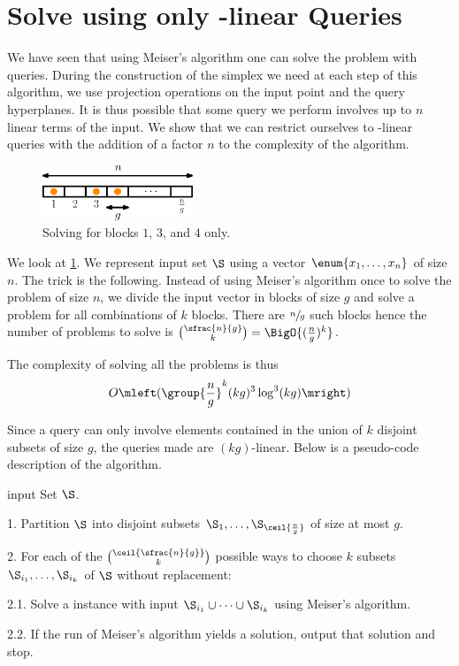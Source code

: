 \section{Solve \kSUM using only -linear Queries}

We have seen that using Meiser's algorithm one can solve the \kSUM problem
with  queries. During the construction of the simplex we
need at each step of this algorithm, we use projection operations on
the input point and the query hyperplanes. It is thus possible that some query we perform
involves up to \(n\) linear terms of the input.
We show that we can restrict ourselves to
-linear queries with the addition of a factor \(n\) to the complexity
of the algorithm.

\begin{figure}
\centering
\includegraphics[width=0.4\textwidth]{fig/point-location/blocks}
\caption{Solving \kSUM for blocks \(1\), \(3\), and \(4\) only.}
\label{fig:point-location:on:blocks}
\end{figure}

We look at \ref{fig:point-location:on:blocks}. We represent input set \(\S\)
using a vector \(\enum{x_1,\ldots,x_n}\) of size \(n\). The trick is the
following. Instead of using Meiser's algorithm once to solve the problem of
size \(n\), we divide the input vector in blocks of size \(g\) and solve a
\kSUM problem for all combinations of \(k\) blocks. There are \(\sfrac{n}{g}\)
such blocks hence the number of problems to solve is \(\binom{\sfrac{n}{g}}{k}
= \BigO{(\frac{n}{g})^k} \).

The complexity of solving all the problems is thus
\begin{displaymath}
O\mleft(\group{\frac{n}{g}}^k (kg)^3 \log^3 (kg)\mright)
\end{displaymath}

Since a query can only involve elements contained in the union of \(k\)
disjoint subsets of size \(g\), the queries made are \((kg)\)-linear. Below is
a pseudo-code description of the algorithm.
\begin{algorithm}
\item[input] Set \(\S\).
\item[1.] Partition \(\S\) into disjoint subsets
\(\S_1,\ldots,\S_{\ceil{\frac{n}{g}}}\) of size at most \(g\).
\item[2.] For each of the \(\binom{\ceil{\sfrac{n}{g}}}{k}\) possible ways to
choose \(k\) subsets \(\S_{i_1},\ldots,\S_{i_k}\) of \(\S\) without
replacement:
\item[2.1.] Solve a \kSUM instance with input \(\S_{i_1} \cup \cdots \cup
\S_{i_k}\) using Meiser's algorithm.
\item[2.2.] If the run of Meiser's algorithm yields a solution, output that
solution and stop.
\end{algorithm}

